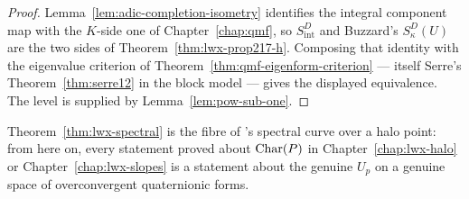 \begin{proof}
  \leanok
  Lemma~\ref{lem:adic-completion-isometry} identifies the integral component map with the
  $K$-side one of Chapter~\ref{chap:qmf}, so $S^{D}_{\mathrm{int}}$ and Buzzard's
  $S^{D}_{\kappa}(U)$ are the two sides of Theorem~\ref{thm:lwx-prop217-h}.  Composing that
  identity with the eigenvalue criterion of Theorem~\ref{thm:qmf-eigenform-criterion} --- itself
  Serre's Theorem~\ref{thm:serre12} in the block model --- gives the displayed equivalence.  The
  level is supplied by Lemma~\ref{lem:pow-sub-one}.
\end{proof}

Theorem~\ref{thm:lwx-spectral} is the fibre of \cite[Definition 2.13]{LWX}'s spectral curve over
a halo point: from here on, every statement proved about $\operatorname{Char}(P)$ in
Chapter~\ref{chap:lwx-halo} or Chapter~\ref{chap:lwx-slopes} is a statement about the genuine
$U_p$ on a genuine space of overconvergent quaternionic forms.

